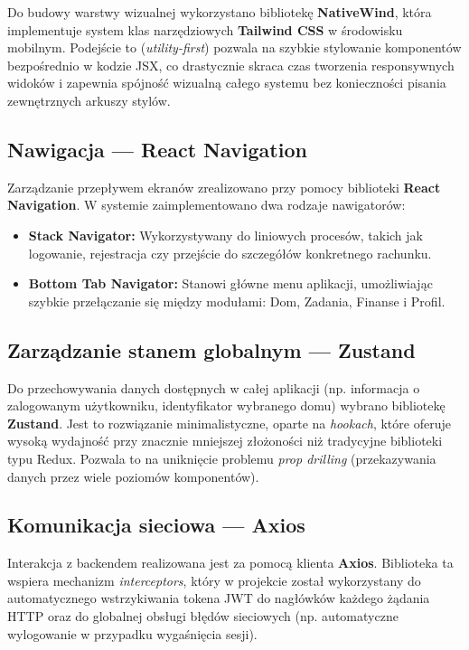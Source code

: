 Do budowy warstwy wizualnej wykorzystano bibliotekę \textbf{NativeWind}, która implementuje system klas narzędziowych \textbf{Tailwind CSS} w środowisku mobilnym. Podejście to (\textit{utility-first}) pozwala na szybkie stylowanie komponentów bezpośrednio w kodzie JSX, co drastycznie skraca czas tworzenia responsywnych widoków i zapewnia spójność wizualną całego systemu bez konieczności pisania zewnętrznych arkuszy stylów.

\subsection{Nawigacja --- React Navigation}

Zarządzanie przepływem ekranów zrealizowano przy pomocy biblioteki \textbf{React Navigation}. W systemie zaimplementowano dwa rodzaje nawigatorów:
\begin{itemize}
\item \textbf{Stack Navigator:} Wykorzystywany do liniowych procesów, takich jak logowanie, rejestracja czy przejście do szczegółów konkretnego rachunku.
\item \textbf{Bottom Tab Navigator:} Stanowi główne menu aplikacji, umożliwiając szybkie przełączanie się między modułami: Dom, Zadania, Finanse i Profil.
\end{itemize}

\subsection{Zarządzanie stanem globalnym --- Zustand}

Do przechowywania danych dostępnych w całej aplikacji (np. informacja o zalogowanym użytkowniku, identyfikator wybranego domu) wybrano bibliotekę \textbf{Zustand}. Jest to rozwiązanie minimalistyczne, oparte na \textit{hookach}, które oferuje wysoką wydajność przy znacznie mniejszej złożoności niż tradycyjne biblioteki typu Redux. Pozwala to na uniknięcie problemu \textit{prop drilling} (przekazywania danych przez wiele poziomów komponentów).

\subsection{Komunikacja sieciowa --- Axios}

Interakcja z backendem realizowana jest za pomocą klienta \textbf{Axios}. Biblioteka ta wspiera mechanizm \textit{interceptors}, który w projekcie został wykorzystany do automatycznego wstrzykiwania tokena JWT do nagłówków każdego żądania HTTP oraz do globalnej obsługi błędów sieciowych (np. automatyczne wylogowanie w przypadku wygaśnięcia sesji).

